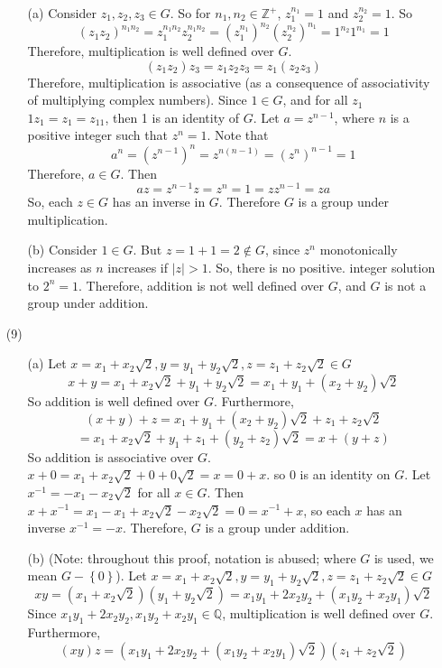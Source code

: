 \documentclass[12pt]{article}
\begin{document}
\begin{itemize}
\begin{itemize}
\item[(a)] Consider $z_1, z_2, z_3 \in G$. So for $n_1, n_2 \in \mathbb{Z}^+$, $z_1^{n_1} = 1$ and $z_2^{n_2} = 1$. So
$$(z_1z_2)^{n_1n_2} = z_1^{n_1n_2}z_2^{n_1n_2} = (z_1^{n_1})^{n_2}(z_2^{n_2})^{n_1} = 1^{n_2}1^{n_1} = 1$$
Therefore, multiplication is well defined over $G$.
$$(z_1z_2)z_3 = z_1z_2z_3 = z_1(z_2z_3)$$
Therefore, multiplication is associative (as a consequence of associativity of multiplying complex numbers). Since $1 \in G$, and for all $z_1$ $1z_1 = z_1 = z_11$, then 1 is an identity of $G$. Let $a = z^{n - 1}$, where $n$ is a positive integer such that $z^n = 1$. Note that
$$a^n = (z^{n-1})^n = z^{n(n - 1)} = (z^n)^{n - 1} = 1$$
Therefore, $a \in G$. Then
$$az = z^{n-1}z = z^n = 1 = zz^{n-1} = za$$
So, each $z \in G$ has an inverse in $G$. Therefore $G$ is a group under multiplication.
\item[(b)] Consider $1 \in G$. But $z = 1 + 1 = 2 \not \in G$, since $z^n$ monotonically increases as $n$ increases if $|z| > 1$. So, there is no positive. integer solution to $2^n = 1$. Therefore, addition is not well defined over $G$, and $G$ is not a group under addition.
\end{itemize}
\item[(9)]
\begin{itemize}
\item[(a)]
Let $x = x_1 + x_2\sqrt{2}, y = y_1 + y_2\sqrt{2}, z = z_1 + z_2\sqrt{2} \in G$
$$x + y = x_1 + x_2\sqrt{2} + y_1 + y_2\sqrt{2} = x_1 + y_1 + (x_2 + y_2)\sqrt{2}$$
So addition is well defined over $G$. Furthermore,
$$(x + y) + z = x_1 + y_1 + (x_2 + y_2)\sqrt{2} + z_1 + z_2\sqrt{2}$$
$$ = x_1 + x_2\sqrt{2} + y_1 + z_1 + (y_2 + z_2)\sqrt{2} = x + (y + z)$$
So addition is associative over $G$. $x + 0 = x_1 + x_2\sqrt{2} + 0 + 0\sqrt{2} = x = 0 + x$. so $0$ is an identity on $G$. Let $x^{-1} = -x_1 - x_2\sqrt{2}$ for all $x \in G$. Then $x + x^{-1} = x_1 - x_1 + x_2\sqrt{2} - x_2\sqrt{2} = 0 = x^{-1} + x$, so each $x$ has an inverse $x^{-1} = -x$. Therefore, $G$ is a group under addition.
\item[(b)]
(Note: throughout this proof, notation is abused; where $G$ is used, we mean $G - \left\lbrace 0 \right\rbrace$). Let $x = x_1 + x_2\sqrt{2}, y = y_1 + y_2\sqrt{2}, z = z_1 + z_2\sqrt{2} \in G$
$$xy = (x_1 + x_2\sqrt{2})(y_1 + y_2\sqrt{2}) = x_1y_1 + 2x_2y_2 + (x_1y_2 + x_2y_1)\sqrt{2}$$
Since $x_1y_1 + 2x_2y_2, x_1y_2 + x_2y_1 \in \mathbb{Q}$, multiplication is well defined over $G$. Furthermore,
$$(xy)z = (x_1y_1 + 2x_2y_2 + (x_1y_2 + x_2y_1)\sqrt{2})(z_1 + z_2\sqrt{2})$$

\end{itemize}
\end{itemize}
\end{document}
